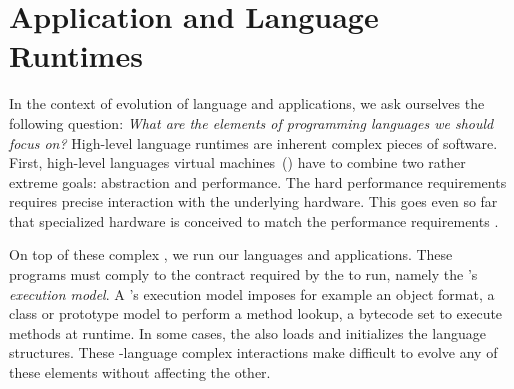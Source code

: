 


\section{Application and Language Runtimes}

In the context of evolution of language and applications, we ask ourselves the following question: \emph{What are the elements of programming languages we should focus on?} High-level language runtimes are inherent complex pieces of software.
First, high-level languages virtual machines~(\VMs) have to combine two rather extreme goals: abstraction and performance.
The hard performance requirements requires precise interaction with the underlying hardware.
This goes even so far that specialized hardware is conceived to match the performance requirements \cite{Unga84a,Stef84a,McGh98a,Clic05a}.


On top of these complex \VMs, we run our  languages and applications.
These programs must comply to the contract required by the \VM to run, namely the \VM's \emph{execution model}.
A \VM's execution model imposes for example an object format, a class or prototype model to perform a method lookup, a bytecode set to execute methods at runtime.
In some cases, the \VM also loads and initializes the language structures.
These \VM-language complex interactions make difficult to evolve any of these elements without affecting the other.


